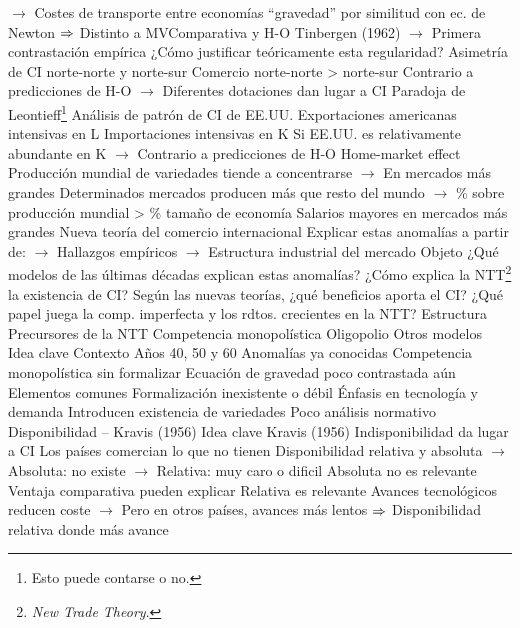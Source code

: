 \documentclass{nuevotema}
\begin{document}
\begin{esquemal}
				\4[] $\to$ Costes de transporte entre economías
				\4[] ``gravedad'' por similitud con ec. de Newton
				\4[] $\Rightarrow$ Distinto a MVComparativa y H-O
				\4[] Tinbergen (1962)
				\4[] $\to$ Primera contrastación empírica
				\4[] ¿Cómo justificar teóricamente esta regularidad?
				\4[III] Asimetría de CI norte-norte y norte-sur
				\4[] Comercio norte-norte > norte-sur
				\4[] Contrario a predicciones de H-O
				\4[] $\to$ Diferentes dotaciones dan lugar a CI
				\4[IV] Paradoja de Leontieff\footnote{Esto puede contarse o no.}
				\4[] Análisis de patrón de CI de EE.UU.
				\4[] Exportaciones americanas intensivas en L
				\4[] Importaciones intensivas en K
				\4[] Si EE.UU. es relativamente abundante en K
				\4[] $\to$ Contrario a predicciones de H-O
				\4[V] Home-market effect
				\4[] Producción mundial de variedades tiende a concentrarse
				\4[] $\to$ En mercados más grandes
				\4[] Determinados mercados producen más que resto del mundo
				\4[] $\to$ \% sobre producción mundial > \% tamaño de economía
				\4[] Salarios mayores en mercados más grandes
				\4 Nueva teoría del comercio internacional
				\4[] Explicar estas anomalías a partir de:
				\4[] $\to$ Hallazgos empíricos
				\4[] $\to$ Estructura industrial del mercado
		\2 Objeto
			\3 ¿Qué modelos de las últimas décadas explican estas anomalías?
			\3 ¿Cómo explica la NTT\footnote{\textit{New Trade Theory}.} la existencia de CI?
			\3 Según las nuevas teorías, ¿qué beneficios aporta el CI?
			\3 ¿Qué papel juega la comp. imperfecta y los rdtos. crecientes en la NTT?
		\2 Estructura
			\3 Precursores de la NTT
			\3 Competencia monopolística
			\3 Oligopolio
			\3 Otros modelos
	\1 
		\2 Idea clave
			\3 Contexto
				\4 Años 40, 50 y 60
				\4 Anomalías ya conocidas
				\4 Competencia monopolística sin formalizar
				\4 Ecuación de gravedad poco contrastada aún
			\3 Elementos comunes
				\4 Formalización inexistente o débil
				\4 Énfasis en tecnología y demanda
				\4 Introducen existencia de variedades
				\4 Poco análisis normativo
		\2 Disponibilidad -- Kravis (1956)
			\3 Idea clave
				\4 Kravis (1956)
				\4 Indisponibilidad da lugar a CI
				\4[] Los países comercian lo que no tienen
				\4[] Disponibilidad relativa y absoluta
				\4[] $\to$ Absoluta: no existe
				\4[] $\to$ Relativa: muy caro o dificil
				\4 Absoluta no es relevante
				\4[] Ventaja comparativa pueden explicar
				\4 Relativa es relevante
				\4[] Avances tecnológicos reducen coste
				\4[] $\to$ Pero en otros países, avances más lentos
				\4[] $\Rightarrow$ Disponibilidad relativa donde más avance

\end{esquemal}
\end{document}
